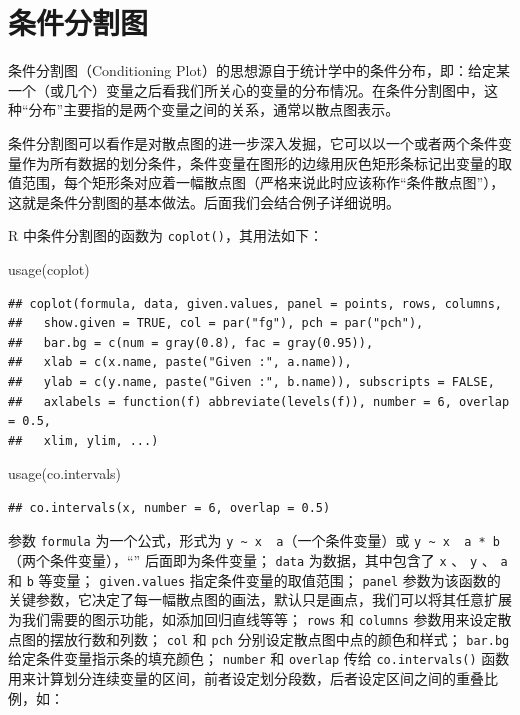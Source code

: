 \documentclass[
  b5paper,
  UTF8,twoside]{book}
\newenvironment{Shaded}{\begin{snugshade}}{\end{snugshade}}
\newcommand{\FunctionTok}[1]{\textcolor[rgb]{0.00,0.00,0.00}{#1}}
\newcommand{\NormalTok}[1]{#1}
\begin{document}
\hypertarget{sec:coplot}{%
\section{条件分割图}\label{sec:coplot}}

条件分割图（Conditioning Plot）的思想源自于统计学中的条件分布，即：给定某一个（或几个）变量之后看我们所关心的变量的分布情况。在条件分割图中，这种``分布''主要指的是两个变量之间的关系，通常以散点图表示。

条件分割图可以看作是对散点图的进一步深入发掘，它可以以一个或者两个条件变量作为所有数据的划分条件，条件变量在图形的边缘用灰色矩形条标记出变量的取值范围，每个矩形条对应着一幅散点图（严格来说此时应该称作``条件散点图''），这就是条件分割图的基本做法。后面我们会结合例子详细说明。

R 中条件分割图的函数为 \texttt{coplot()}，其用法如下：

\begin{Shaded}
\begin{Highlighting}[]
\FunctionTok{usage}\NormalTok{(coplot)}
\end{Highlighting}
\end{Shaded}

\begin{verbatim}
## coplot(formula, data, given.values, panel = points, rows, columns,
##   show.given = TRUE, col = par("fg"), pch = par("pch"),
##   bar.bg = c(num = gray(0.8), fac = gray(0.95)),
##   xlab = c(x.name, paste("Given :", a.name)),
##   ylab = c(y.name, paste("Given :", b.name)), subscripts = FALSE,
##   axlabels = function(f) abbreviate(levels(f)), number = 6, overlap = 0.5,
##   xlim, ylim, ...)
\end{verbatim}

\begin{Shaded}
\begin{Highlighting}[]
\FunctionTok{usage}\NormalTok{(co.intervals)}
\end{Highlighting}
\end{Shaded}

\begin{verbatim}
## co.intervals(x, number = 6, overlap = 0.5)
\end{verbatim}

参数 \texttt{formula} 为一个公式，形式为 \texttt{y\ \textasciitilde{}\ x\ \textbar{}\ a}（一个条件变量）或 \texttt{y\ \textasciitilde{}\ x\ \textbar{}\ a\ *\ b}（两个条件变量），``\texttt{\textbar{}}'' 后面即为条件变量； \texttt{data} 为数据，其中包含了 \texttt{x} 、 \texttt{y} 、 \texttt{a} 和 \texttt{b} 等变量； \texttt{given.values} 指定条件变量的取值范围； \texttt{panel} 参数为该函数的关键参数，它决定了每一幅散点图的画法，默认只是画点，我们可以将其任意扩展为我们需要的图示功能，如添加回归直线等等； \texttt{rows} 和 \texttt{columns} 参数用来设定散点图的摆放行数和列数； \texttt{col} 和 \texttt{pch} 分别设定散点图中点的颜色和样式； \texttt{bar.bg} 给定条件变量指示条的填充颜色； \texttt{number} 和 \texttt{overlap} 传给 \texttt{co.intervals()} 函数用来计算划分连续变量的区间，前者设定划分段数，后者设定区间之间的重叠比例，如：
\end{document}
